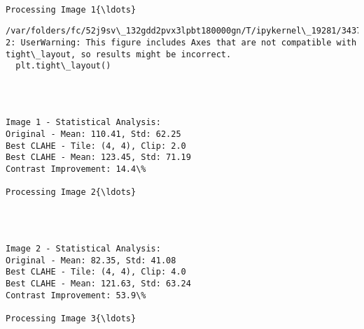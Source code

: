 \documentclass[11pt]{article}
\begin{document}
    \begin{Verbatim}[commandchars=\\\{\}]

Processing Image 1{\ldots}
    \end{Verbatim}

    \begin{Verbatim}[commandchars=\\\{\}]
/var/folders/fc/52j9sv\_132gdd2pvx3lpbt180000gn/T/ipykernel\_19281/3437559743.py:6
2: UserWarning: This figure includes Axes that are not compatible with
tight\_layout, so results might be incorrect.
  plt.tight\_layout()
    \end{Verbatim}

    \begin{center}
    \end{center}
    { \hspace*{\fill} \\}
    
    \begin{Verbatim}[commandchars=\\\{\}]

Image 1 - Statistical Analysis:
Original - Mean: 110.41, Std: 62.25
Best CLAHE - Tile: (4, 4), Clip: 2.0
Best CLAHE - Mean: 123.45, Std: 71.19
Contrast Improvement: 14.4\%

Processing Image 2{\ldots}
    \end{Verbatim}

    \begin{center}
    \end{center}
    { \hspace*{\fill} \\}
    
    \begin{Verbatim}[commandchars=\\\{\}]

Image 2 - Statistical Analysis:
Original - Mean: 82.35, Std: 41.08
Best CLAHE - Tile: (4, 4), Clip: 4.0
Best CLAHE - Mean: 121.63, Std: 63.24
Contrast Improvement: 53.9\%

Processing Image 3{\ldots}
    \end{Verbatim}

    \begin{center}
    \end{center}
    { \hspace*{\fill} \\}
    
\end{document}
